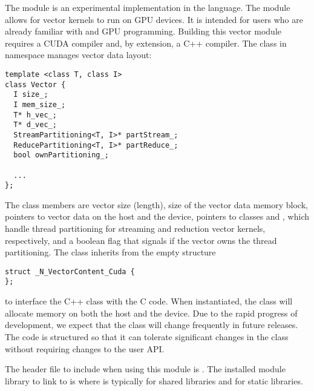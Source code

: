 %
The {\nveccuda} module is an experimental {\nvector} implementation in the {\cuda} language.
The module allows for {\sundials} vector kernels to run on GPU devices. It is intended for users
who are already familiar with {\cuda} and GPU programming. Building this vector 
module requires a CUDA compiler and, by extension, a C++ compiler. The class  
in namespace  manages vector data layout: 
\begin{verbatim} 
template <class T, class I>
class Vector {
  I size_;
  I mem_size_;
  T* h_vec_;
  T* d_vec_;
  StreamPartitioning<T, I>* partStream_;
  ReducePartitioning<T, I>* partReduce_;
  bool ownPartitioning_;
  
  ...
};
\end{verbatim}

The class members are vector size (length), size of the vector data memory block, pointers
to vector data on the host and the device, pointers to classes 
and , which handle thread partitioning for streaming and 
reduction vector kernels, respectively, and a boolean flag that signals if the
vector owns the thread partitioning. The class  inherits from the empty structure
\begin{verbatim} 
struct _N_VectorContent_Cuda {
};
\end{verbatim}
to interface the C++ class with the {\nvector} C code. When instantiated, the class
 will allocate memory on both the host and the device. Due to the rapid
progress of {\cuda} development, we expect that the 
class will change frequently in future {\sundials} releases. The code is
structured so that it can tolerate significant changes in the 
 class without requiring changes to the user API.


The header file to include when using this module is .
The installed module library to link to is
where  is typically  for shared libraries and 
for static libraries.

